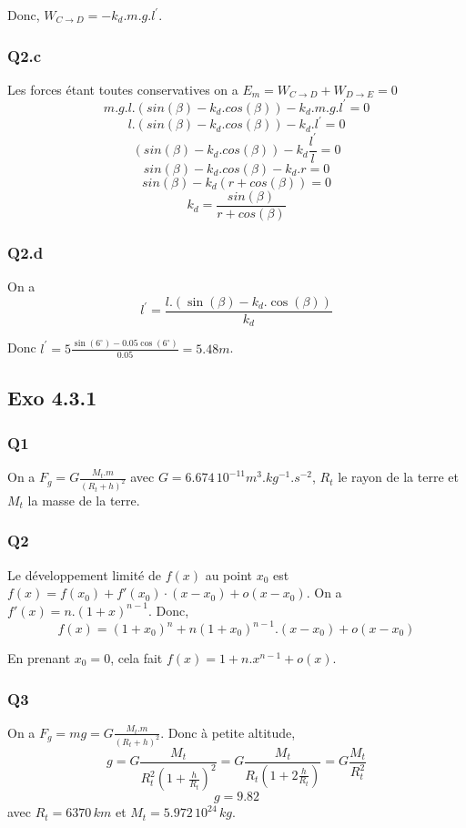\documentclass[]{book}
\theoremstyle{definition}
\begin{document}
Donc, $W_{C \to D} = -k_d.m.g.l^\prime$.

\subsubsection{Q2.c}
Les forces \'etant toutes conservatives on a $E_m = W_{C \to D} + W_{D \to E} = 0$
$$ m.g.l.(sin(\beta) - k_d.cos(\beta)) -k_d.m.g.l^\prime = 0$$
$$ l.(sin(\beta) - k_d.cos(\beta)) -k_d.l^\prime = 0$$
$$ (sin(\beta) - k_d.cos(\beta)) -k_d\frac{l^\prime}{l} = 0$$
$$ sin(\beta) - k_d.cos(\beta) -k_d.r = 0$$
$$ sin(\beta) - k_d(r+cos(\beta)) = 0$$
$$ k_d = \frac{sin(\beta)}{r+cos(\beta)}$$

\subsubsection{Q2.d}
On a 
$$l^\prime = \frac{l.(\sin(\beta) - k_d.\cos(\beta))}{k_d} $$

Donc $l^\prime = 5\frac{\sin(6^\circ) - 0.05\cos(6^\circ)}{0.05} = 5.48m$.

\subsection*{Exo 4.3.1}
\subsubsection{Q1}
On a $F_g = G\frac{M_t.m}{(R_t+h)^2}$ avec $G= 6.674\,10^{-11} m^3.kg^{-1}.s^{-2}$, $R_t$ le rayon de la terre et $M_t$ la masse de la terre.

\subsubsection{Q2}
Le d\'eveloppement limit\'e de $f(x)$ au point $x_0$ est $f(x)=f(x_{0})+f'(x_{0}) \cdot (x-x_{0})+o(x-x_{0})$. On a $f'(x) = n.(1+x)^{n-1}$. Donc,
$$f(x) = (1+x_0)^n + n(1+x_0)^{n-1}.(x-x_0) + o(x-x_{0})$$

En prenant $x_0 = 0$, cela fait $f(x) = 1 + n.x^{n-1} + o(x)$.

\subsubsection{Q3}
On a $F_g = mg = G\frac{M_t.m}{(R_t+h)^2}$. Donc \`a petite altitude, 
$$g=G\frac{M_t}{R_t^2(1+\frac{h}{R_t})^2} = G\frac{M_t}{R_t(1+2\frac{h}{R_t})} = G\frac{M_t}{R_t^2}$$
$$g = 9.82$$
avec $R_t = 6370\,km$ et $M_t = 5.972\,10^{24}\,kg$. 
\end{document}
